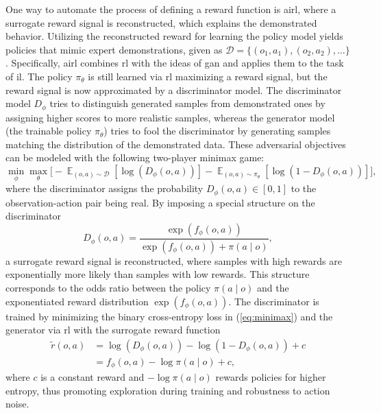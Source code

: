 \documentclass[a4paper,12pt,onecolumn]{article}
\begin{document}
One way to automate the process of defining a reward function is \gls{airl}, where a surrogate reward signal is reconstructed, which explains the demonstrated behavior. Utilizing the reconstructed reward for learning the policy model yields policies that mimic expert demonstrations, given as $\mathcal{D}=\{ (o_1, a_1), (o_2, a_2), \dots \}$. 
Specifically, \gls{airl} combines \gls{rl} with the ideas of \gls{gan} and applies them to the task of \gls{il}. The policy $\pi_\theta$ is still learned via \gls{rl} maximizing a reward signal, but the reward signal is now approximated by a discriminator model. The discriminator model $D_\phi$ tries to distinguish generated samples from demonstrated ones by assigning higher scores to more realistic samples, whereas the generator model (the trainable policy $\pi_\theta$) tries to fool the discriminator by generating samples matching the distribution of the demonstrated data. These adversarial objectives can be modeled with the following two-player minimax game:
\begin{equation}\label{eq:minimax}
    \min_\phi \max_\theta \biggl[ -\mathop{\mathbb{E}}_{(o, a) \sim \mathcal{D}} \left[ \log \left( D_\phi (o, a) \right) \right]  -\mathop{\mathbb{E}}_{(o, a) \sim \pi_\theta} \left[ \log \left( 1 - D_\phi (o, a) \right) \right] \biggr],
\end{equation}
where the discriminator assigns the probability $D_\phi (o, a) \in \left[0, 1 \right]$ to the observation-action pair being real. By imposing a special structure on the discriminator
\begin{equation}\label{eq:airl_probab_exp}
    D_\phi(o, a) = \frac{\exp \left(f_\phi (o, a) \right)}{\exp \left( f_\phi (o, a) \right) + \pi \left(a \mid o \right)},
\end{equation}
a surrogate reward signal is reconstructed, where samples with high rewards are exponentially more likely than samples with low rewards. This structure corresponds to the odds ratio between the policy $\pi \left(a \mid o \right)$ and the exponentiated reward distribution $\exp \left( f_\phi (o, a) \right)$. The discriminator is trained by minimizing the binary cross-entropy loss in (\ref{eq:minimax}) and the generator via \gls{rl} with the surrogate reward function 
\begin{equation}\label{eq:airl_surrogate}
    \begin{aligned}
        \tilde{r}(o, a) &= \log \left( D_\phi (o, a) \right) - \log \left( 1 -  D_\phi (o, a) \right) + c \\
        &= f_\phi(o, a) - \log \pi \left(a \mid o \right) + c,
    \end{aligned}
\end{equation}
where $c$ is a constant reward and $- \log \pi \left(a \mid o \right)$ rewards policies for higher entropy, thus promoting exploration during training and robustness to action noise.
\end{document}
